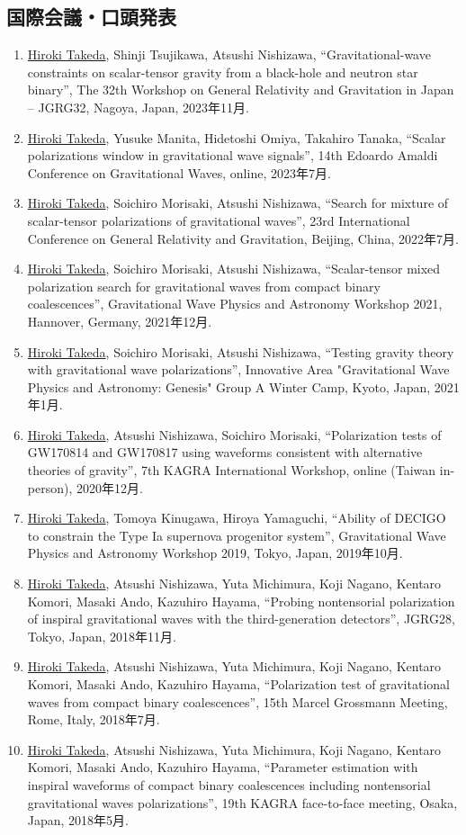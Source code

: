 \documentclass[uplatex, 11pt]{jsarticle}
\begin{document}
\subsection*{国際会議・口頭発表}
\begin{enumerate}
\item \uline{Hiroki Takeda}, Shinji Tsujikawa, Atsushi Nishizawa, “Gravitational-wave constraints on scalar-tensor gravity from a black-hole and neutron star binary”, The 32th Workshop on General Relativity and Gravitation in Japan – JGRG32, Nagoya, Japan, 2023年11月.
\item \uline{Hiroki Takeda}, Yusuke Manita, Hidetoshi Omiya, Takahiro Tanaka, “Scalar polarizations window in gravitational wave signals”, 14th Edoardo Amaldi Conference on Gravitational Waves, online, 2023年7月.
\item \uline{Hiroki Takeda}, Soichiro Morisaki, Atsushi Nishizawa, “Search for mixture of scalar-tensor polarizations of gravitational waves”, 23rd International Conference on General Relativity and Gravitation, Beijing, China, 2022年7月.
\item \uline{Hiroki Takeda}, Soichiro Morisaki, Atsushi Nishizawa, “Scalar-tensor mixed polarization search for gravitational waves from compact binary coalescences”, Gravitational Wave Physics and Astronomy Workshop 2021, Hannover, Germany, 2021年12月.
\item \uline{Hiroki Takeda}, Soichiro Morisaki, Atsushi Nishizawa, “Testing gravity theory with gravitational wave polarizations”, Innovative Area "Gravitational Wave Physics and Astronomy: Genesis" Group A Winter Camp, Kyoto, Japan, 2021年1月.
\item \uline{Hiroki Takeda}, Atsushi Nishizawa, Soichiro Morisaki, “Polarization tests of GW170814 and GW170817 using waveforms consistent with alternative theories of gravity”, 7th KAGRA International Workshop, online (Taiwan in-person), 2020年12月.
\item \uline{Hiroki Takeda}, Tomoya Kinugawa, Hiroya Yamaguchi, “Ability of DECIGO to constrain the Type Ia supernova progenitor system”, Gravitational Wave Physics and Astronomy Workshop 2019, Tokyo, Japan, 2019年10月.
\item \uline{Hiroki Takeda}, Atsushi Nishizawa, Yuta Michimura, Koji Nagano, Kentaro Komori, Masaki Ando, Kazuhiro Hayama, “Probing nontensorial polarization of inspiral gravitational waves with the third-generation detectors”, JGRG28, Tokyo, Japan, 2018年11月.
\item \uline{Hiroki Takeda}, Atsushi Nishizawa, Yuta Michimura, Koji Nagano, Kentaro Komori, Masaki Ando, Kazuhiro Hayama, “Polarization test of gravitational waves from compact binary coalescences”, 15th Marcel Grossmann Meeting, Rome, Italy, 2018年7月.
\item \uline{Hiroki Takeda}, Atsushi Nishizawa, Yuta Michimura, Koji Nagano, Kentaro Komori, Masaki Ando, Kazuhiro Hayama, “Parameter estimation with inspiral waveforms of compact binary coalescences including nontensorial gravitational waves polarizations”, 19th KAGRA face-to-face meeting, Osaka, Japan, 2018年5月.
\end{enumerate}
\end{document}
